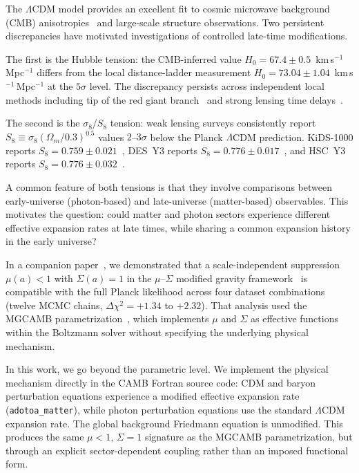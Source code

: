 \documentclass[11pt]{article}
\begin{document}
The $\Lambda$CDM model provides an excellent fit to cosmic microwave
background (CMB) anisotropies~\citep{PlanckCollaboration2020b} and
large-scale structure observations.  Two persistent discrepancies have
motivated investigations of controlled late-time modifications.

The first is the Hubble tension: the CMB-inferred value
$H_0 = 67.4 \pm 0.5$~km\,s$^{-1}$\,Mpc$^{-1}$
\citep{PlanckCollaboration2020b}
differs from the local distance-ladder measurement
$H_0 = 73.04 \pm 1.04$~km\,s$^{-1}$\,Mpc$^{-1}$
\citep{Riess2022}
at the $5\sigma$ level.  The discrepancy persists across independent
local methods including tip of the red giant branch~\citep{Freedman2021}
and strong lensing time delays~\citep{Wong2020}.

The second is the $\sigma_8$/$S_8$ tension: weak lensing surveys
consistently report $S_8 \equiv \sigma_8(\Omega_m/0.3)^{0.5}$ values
$2$--$3\sigma$ below the Planck $\Lambda$CDM prediction.  KiDS-1000
reports $S_8 = 0.759 \pm 0.021$~\citep{Heymans2021}, DES~Y3 reports
$S_8 = 0.776 \pm 0.017$~\citep{Abbott2022}, and HSC~Y3 reports
$S_8 = 0.776 \pm 0.032$~\citep{Li2023}.

A common feature of both tensions is that they involve comparisons
between early-universe (photon-based) and late-universe (matter-based)
observables.  This motivates the question: could matter and photon
sectors experience different effective expansion rates at late times,
while sharing a common expansion history in the early universe?

In a companion paper~\citep{Mahaffey2026obs}, we demonstrated that a
scale-independent suppression $\mu(a) < 1$ with $\Sigma(a) = 1$ in the
$\mu$--$\Sigma$ modified gravity framework~\citep{PogosianSilvestri2016}
is compatible with the full Planck likelihood across four dataset
combinations (twelve MCMC chains, $\Delta\chi^2 = +1.34$ to $+2.32$).
That analysis used the MGCAMB parametrization~\citep{Wang2023}, which
implements $\mu$ and $\Sigma$ as effective functions within the
Boltzmann solver without specifying the underlying physical mechanism.

In this work, we go beyond the parametric level.  We implement the
physical mechanism directly in the CAMB Fortran source code: CDM and
baryon perturbation equations experience a modified effective expansion
rate (\texttt{adotoa\_matter}), while photon perturbation equations use
the standard $\Lambda$CDM expansion rate.  The global background
Friedmann equation is unmodified.  This produces the same $\mu < 1$,
$\Sigma = 1$ signature as the MGCAMB parametrization, but through an
explicit sector-dependent coupling rather than an imposed functional
form.
\end{document}
